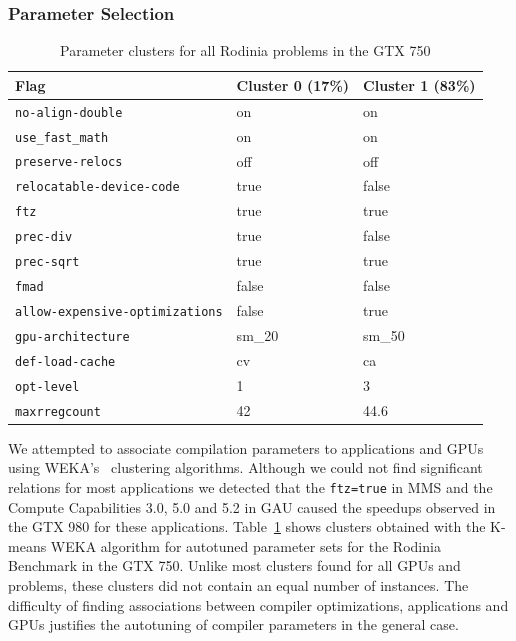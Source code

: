 \subsubsection{Parameter Selection}

\begin{table}[htpb]
    \centering
    \footnotesize
    \begin{tabular}{lll}
        \toprule
        \textbf{Flag} & \textbf{Cluster 0 (17\%)} & \textbf{Cluster 1 (83\%)} \\\midrule
        \texttt{no-align-double}               & on     & on     \\
        \texttt{use\_fast\_math}               & on     & on     \\
        \texttt{preserve-relocs}               & off    & off    \\
        \texttt{relocatable-device-code}       & true   & false  \\
        \texttt{ftz}                           & true   & true   \\
        \texttt{prec-div}                      & true   & false  \\
        \texttt{prec-sqrt}                     & true   & true   \\
        \texttt{fmad}                          & false  & false  \\
        \texttt{allow-expensive-optimizations} & false  & true   \\
        \texttt{gpu-architecture}              & sm\_20 & sm\_50 \\
        \texttt{def-load-cache}                & cv     & ca     \\
        \texttt{opt-level}                     & 1      & 3      \\
        \texttt{maxrregcount}                  & 42     & 44.6   \\\bottomrule
        \end{tabular}
    \caption{Parameter clusters for all Rodinia problems in the GTX 750}
    \label{tab:750RodiniaClusters}
\end{table}

We attempted to associate compilation parameters to applications and GPUs using
WEKA's~\cite{holmes1994weka} clustering algorithms. Although we could not find
significant relations for most applications we detected that the
\texttt{ftz=true} in MMS and the Compute Capabilities 3.0, 5.0 and 5.2 in GAU
caused the speedups observed in the GTX 980 for these applications.
Table~\ref{tab:750RodiniaClusters} shows clusters obtained with the K-means
WEKA algorithm for autotuned parameter sets for the Rodinia Benchmark in the
GTX 750. Unlike most clusters found for all GPUs and problems, these clusters
did not contain an equal number of instances. The difficulty of finding
associations between compiler optimizations, applications and GPUs justifies
the autotuning of compiler parameters in the general case.

